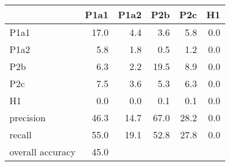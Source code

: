 \begin{tabular}{lrrrrr}
\toprule
{} &  P1a1 &  P1a2 &   P2b &   P2c &   H1 \\
\midrule
P1a1             &  17.0 &   4.4 &   3.6 &   5.8 &  0.0 \\
P1a2             &   5.8 &   1.8 &   0.5 &   1.2 &  0.0 \\
P2b              &   6.3 &   2.2 &  19.5 &   8.9 &  0.0 \\
P2c              &   7.5 &   3.6 &   5.3 &   6.3 &  0.0 \\
H1               &   0.0 &   0.0 &   0.1 &   0.1 &  0.0 \\
precision        &  46.3 &  14.7 &  67.0 &  28.2 & 0.0     \\
recall           &  55.0 &  19.1 &  52.8 &  27.8 &  0.0 \\
overall accuracy &  45.0 &       &       &       &      \\
\bottomrule
\end{tabular}
